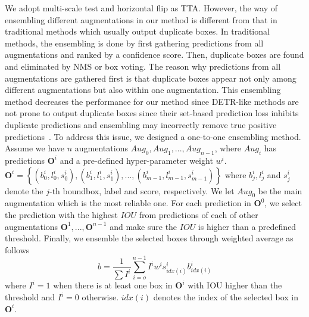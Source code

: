 \documentclass[runningheads]{llncs}
\begin{document}
We adopt multi-scale test and horizontal flip as TTA. However, the way of ensembling different augmentations in our method is different from that in traditional methods which usually output duplicate boxes. In traditional methods, the ensembling is done by first gathering predictions from all augmentations and ranked by a confidence score. Then, duplicate boxes are found and eliminated by NMS or box voting. The reason why predictions from all augmentations are gathered first is that duplicate boxes appear not only among different augmentations but also within one augmentation. This ensembling method decreases the performance for our method since DETR-like methods are not prone to output duplicate boxes since their set-based prediction loss inhibits duplicate predictions and 
ensembling may incorrectly remove true
positive predictions~\cite{carion2020end}. To address this issue, we designed a one-to-one ensembling method. Assume we have $n$ augmentations $Aug_0, Aug_1, ..., Aug_{n-1}$, where $Aug_i$ has predictions $\mathbf{O}^i$ and a pre-defined hyper-parameter weight $w^i$. $\mathbf{O}^i=\left\{(b^i_0,l^i_0,s^i_0),(b^i_1,l^i_1,s^i_1), ...,(b^i_{m-1},l^i_{m-1},s^i_{m-1})\right\}$ where $b^i_j, l^i_j$ and $s^i_j$ denote the $j$-th boundbox, label and score, respectively. We let $Aug_0$ be the main augmentation which is the most reliable one. For each prediction in $\mathbf{O}^0$, we select the prediction with the highest $IOU$ from predictions of each of other augmentations $\mathbf{O}^1,..., \mathbf{O}^{n-1}$ and make sure the $IOU$ is higher than a predefined threshold. Finally, we ensemble the selected boxes through weighted average as follows
\begin{equation}
    b=\frac{1}{\sum I^i}\sum_{i=o}^{n-1} I^iw^is^i_{idx(i)}b^i_{idx(i)}
\end{equation}
where $I^i=1$ when there is at least one box in $\mathbf{O}^i$ with IOU higher than the threshold and $I^i=0$ otherwise. $idx(i)$ denotes the index of the selected box in $\mathbf{O}^i$.
\end{document}
